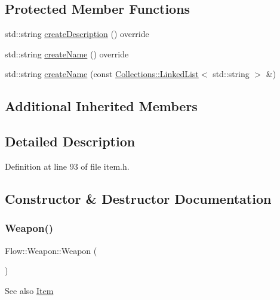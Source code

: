 \subsection*{Protected Member Functions}
\begin{DoxyCompactItemize}
\item 
std\+::string \hyperlink{class_flow_1_1_weapon_a42cc691551e85def9133007c95b2b472}{create\+Description} () override
\item 
std\+::string \hyperlink{class_flow_1_1_weapon_af8b4a298527dfc4e5c16d5ea2136841f}{create\+Name} () override
\item 
std\+::string \hyperlink{class_flow_1_1_weapon_acd4f51875ed9488e144ea7475ebb1760}{create\+Name} (const \hyperlink{class_collections_1_1_linked_list}{Collections\+::\+Linked\+List}$<$ std\+::string $>$ \&)
\end{DoxyCompactItemize}
\subsection*{Additional Inherited Members}


\subsection{Detailed Description}


Definition at line 93 of file item.\+h.



\subsection{Constructor \& Destructor Documentation}
\hypertarget{class_flow_1_1_weapon_ad522593046c51ee386ff98da6bc050cb}{}\label{class_flow_1_1_weapon_ad522593046c51ee386ff98da6bc050cb} 
\subsubsection{\texorpdfstring{Weapon()}{Weapon()}\hspace{0.1cm}{\footnotesize\ttfamily [1/4]}}
{\footnotesize\ttfamily Flow\+::\+Weapon\+::\+Weapon (\begin{DoxyParamCaption}{ }\end{DoxyParamCaption})}

\begin{DoxySeeAlso}{See also}
\hyperlink{class_flow_1_1_item}{Item} 
\end{DoxySeeAlso}


